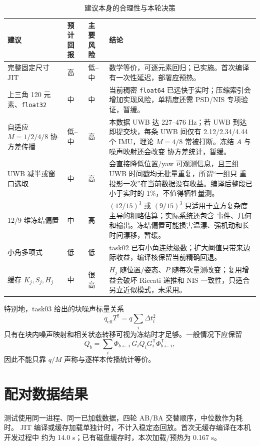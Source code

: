 \documentclass[11pt,a4paper]{ctexart}
\begin{document}
\begin{table}[H]
\centering
\small
\caption{建议本身的合理性与本轮决策}
\begin{tabular}{p{3.1cm}p{2.0cm}p{2.0cm}p{6.0cm}}
\toprule
建议 & 预计回报 & 主要风险 & 结论\\
\midrule
完整固定尺寸 JIT & 高 & 低--中 &
数学等价，可逐元素回归；已实施。首次编译有一次性延迟，部署应预热。\\
上三角 120 元素、\texttt{float32} & 中 & 中 &
当前稠密 \texttt{float64} 已远快于实时；压缩索引会增加实现风险，单精度还需
PSD/NIS 专项验证，暂缓。\\
自适应 $M=1/2/4/8$ 协方差传播 & 低--中 & 高 &
本数据 UWB 达 227--476 Hz；若 UWB 到达即提交块，每条 UWB 间仅有
2.12/2.34/4.44 个 IMU，理论 $M=4/8$ 常被打断。冻结 $A$ 与噪声映射还会改变
协方差统计，暂缓。\\
UWB 减半或窗口选取 & 中 & 高 &
会直接降低位置/yaw 可观测信息，且三组 UWB 时间戳均无批量重复，所谓“一组只
重投影一次”在当前数据没有收益。编译后整段已小于实时的 1\%，不值得牺牲量测。\\
12/9 维冻结偏置 & 中 & 高 &
$(12/15)^3$ 或 $(9/15)^3$ 只适用于立方复杂度主导的粗略估算；实际系统还包含
事件、几何和输出。冻结偏置可能损害温漂、强机动和长时间漂移，暂缓。\\
小角多项式 & 低 & 低 &
task02 已有小角连续级数；扩大阈值只带来边际收益，编译核保留当前精确回退。\\
缓存 $K_j,S_j,H_j$ & 中 & 很高 &
$H_j$ 随位置/姿态、$P$ 随每次量测改变；复用增益会破坏 Riccati 递推和 NIS
一致性，只适合另立近似模式，未采用。\\
\bottomrule
\end{tabular}
\end{table}

特别地，task03 给出的块噪声标量关系
\begin{equation}
 q_{\mathrm{eff}}T^2=q\sum_i\Delta t_i^2
\end{equation}
只有在块内噪声映射和相关状态转移可视为冻结时才足够。一般情况下应保留
\begin{equation}
 Q_b=\sum_i
 \Phi_{b\leftarrow i}\,G_iQ_iG_i^{\mathsf T}
 \Phi_{b\leftarrow i}^{\mathsf T},
\end{equation}
因此不能只靠 $q/M$ 声称与逐样本传播统计等价。

\section{配对数据结果}

测试使用同一进程、同一已加载数据，四轮 AB/BA 交替顺序，中位数作为耗时。
JIT 编译或缓存加载单独计时，不计入稳定态回放。首次无缓存编译在本机开发过程中
约为 14.0 s；已有磁盘缓存时，本次加载/预热为 0.167 s。
\end{document}
